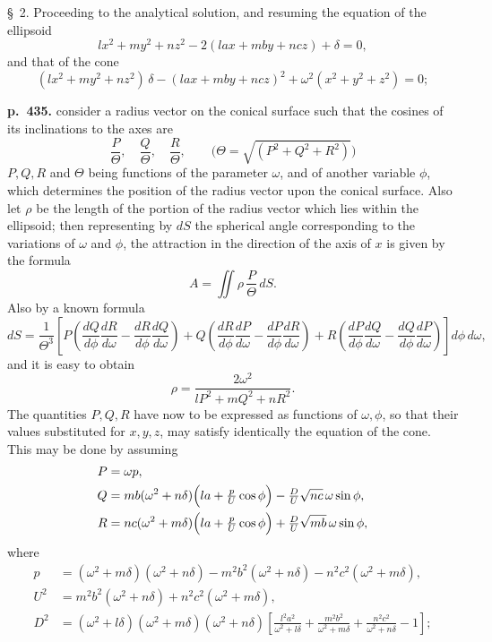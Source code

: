 \documentclass[11pt]{article}
\begin{document}
\smallskip
\S~2. Proceeding to the analytical solution, and resuming the equation of the ellipsoid
\[ lx^2 + my^2 + nz^2 - 2(lax + mby + ncz) + \delta = 0, \]
and that of the cone
\[ (lx^2 + my^2 + nz^2)\,\delta - (lax + mby + ncz)^2 + \omega^2(x^2 + y^2 + z^2) = 0; \]

\noindent\textbf{p.~435.} consider a radius vector on the conical surface such that the cosines of its inclinations to the axes are
\[ \frac{P}{\Theta},\quad \frac{Q}{\Theta},\quad \frac{R}{\Theta},\qquad \bigl(\Theta = \sqrt{(P^2 + Q^2 + R^2)}\bigr) \]
$P, Q, R$ and $\Theta$ being functions of the parameter $\omega$, and of another variable $\phi$, which determines the position of the radius vector upon the conical surface. Also let $\rho$ be the length of the portion of the radius vector which lies within the ellipsoid; then representing by $dS$ the spherical angle corresponding to the variations of $\omega$ and $\phi$, the attraction in the direction of the axis of $x$ is given by the formula
\[ A = \iint \rho\,\frac{P}{\Theta}\,dS. \]
Also by a known formula
\[ dS = \frac{1}{\Theta^3}\left[ P\!\left(\frac{dQ}{d\phi}\frac{dR}{d\omega} - \frac{dR}{d\phi}\frac{dQ}{d\omega}\right) + Q\!\left(\frac{dR}{d\phi}\frac{dP}{d\omega} - \frac{dP}{d\phi}\frac{dR}{d\omega}\right) + R\!\left(\frac{dP}{d\phi}\frac{dQ}{d\omega} - \frac{dQ}{d\phi}\frac{dP}{d\omega}\right)\right]d\phi\,d\omega, \]
and it is easy to obtain
\[ \rho = \frac{2\omega^2}{lP^2 + mQ^2 + nR^2}. \]
The quantities $P, Q, R$ have now to be expressed as functions of $\omega, \phi$, so that their values substituted for $x, y, z$, may satisfy identically the equation of the cone. This may be done by assuming
\[
\begin{aligned}
P &= \omega p,\\
Q &= mb(\omega^2 + n\delta)\Bigl(la + \tfrac{p}{U}\cos\phi\Bigr) - \tfrac{D}{U}\sqrt{nc}\,\omega\sin\phi,\\
R &= nc(\omega^2 + m\delta)\Bigl(la + \tfrac{p}{U}\cos\phi\Bigr) + \tfrac{D}{U}\sqrt{mb}\,\omega\sin\phi,
\end{aligned}
\]
where
\[
\begin{aligned}
p &= (\omega^2 + m\delta)(\omega^2 + n\delta) - m^2 b^2(\omega^2 + n\delta) - n^2 c^2(\omega^2 + m\delta),\\
U^2 &= m^2 b^2(\omega^2 + n\delta) + n^2 c^2(\omega^2 + m\delta),\\
D^2 &= (\omega^2 + l\delta)(\omega^2 + m\delta)(\omega^2 + n\delta)\!\left[\frac{l^2 a^2}{\omega^2 + l\delta} + \frac{m^2 b^2}{\omega^2 + m\delta} + \frac{n^2 c^2}{\omega^2 + n\delta} - 1\right];
\end{aligned}
\]
\end{document}
